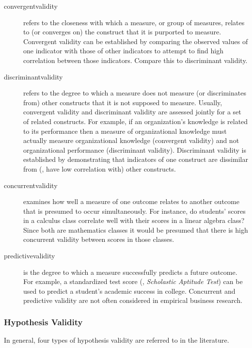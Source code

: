 \begin{description}

	\item[\Gls{convergentvalidity}] refers to the closeness with which a measure, or group of measures, relates to (or converges on) the construct that it is purported to measure. Convergent validity can be established by comparing the observed values of one indicator with those of other indicators to attempt to find high correlation between those indicators. Compare this to discriminant validity.
	
	\item[\gls{discriminantvalidity}] refers to the degree to which a measure does not measure (or discriminates from) other constructs that it is not supposed to measure. Usually, convergent validity and discriminant validity are assessed jointly for a set of related constructs. For example, if an organization's knowledge is related to its performance then a measure of organizational knowledge must actually measure organizational knowledge (convergent validity) and not organizational performance (discriminant validity). Discriminant validity is established by demonstrating that indicators of one construct are dissimilar from (\ie, have low correlation with) other constructs.

	\item[\Gls{concurrentvalidity}] examines how well a measure of one outcome relates to another outcome that is presumed to occur simultaneously. For instance, do students' scores in a calculus class correlate well with their scores in a linear algebra class? Since both are mathematics classes it would be presumed that there is high concurrent validity between scores in those classes. 
	
	\item[\Gls{predictivevalidity}] is the degree to which a measure successfully predicts a future outcome. For example, a standardized test score (\eg, \textit{Scholastic Aptitude Test}) can be used to predict a student's academic success in college. Concurrent and predictive validity are not often considered in empirical business research.

\end{description}

\subsubsection{Hypothesis Validity}

In general, four types of hypothesis validity are referred to in the literature.

